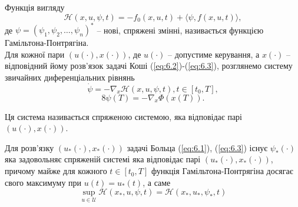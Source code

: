 Функція вигляду
\begin{equation}
    \label{eq:6.4}
    \mathcal{H}(x, u, \psi, t) = - f_0(x, u, t) + \langle \psi, f(x, u, t) \rangle,
\end{equation}
де $\psi = (\psi_1, \psi_2, \ldots, \psi_n)^*$ -- нові, спряжені змінні, називається функцією Гамільтона-Понтрягіна. \\

Для кожної пари $(u(\cdot), x(\cdot))$, де $u(\cdot)$ -- допустиме керування, а $x(\cdot)$ -- відповідний йому розв'язок задачі Коші (\ref{eq:6.2})-(\ref{eq:6.3}), розглянемо систему звичайних диференціальних рівнянь
\begin{equation}
    \label{eq:6.5}
    \dot \psi = - \nabla_x \mathcal{H}(x, u, \psi, t), t \in [t_0, T],
\end{equation}
\begin{equation}8
    \label{eq:6.6}
    \psi(T) = - \nabla_x \Phi(x(T)).
\end{equation}

Ця система називається спряженою системою, яка відповідає парі $(u(\cdot), x(\cdot))$. \\

\begin{theorem}
    Для розв'язку $(u_*(\cdot), x_*(\cdot))$ задачі Больца (\ref{eq:6.1}), (\ref{eq:6.3}) існує $\psi_*(\cdot)$ яка задовольняє спряженій системі яка відповідає парі $(u_*(\cdot), x_*(\cdot))$, причому майже для кожного $t \in [t_0, T]$ функція Гамільтона-Понтрягіна досягає свого максимуму при $u(t) = u_*(t)$, а саме
    \begin{equation*}
        \sup_{u \in \mathcal{U}} \mathcal{H}(x_*, u, \psi, t) = \mathcal{H}(x_*, u_*, \psi_*, t)
    \end{equation*}
\end{theorem}

